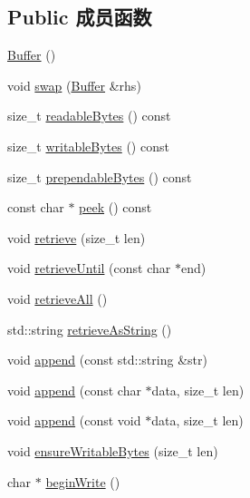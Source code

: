 \subsection*{Public 成员函数}
\begin{DoxyCompactItemize}
\item 
\hyperlink{classmuduo_1_1Buffer_a47587d18a394fb4b9508c61e3d5f0260}{Buffer} ()
\item 
void \hyperlink{classmuduo_1_1Buffer_a5a6560acf9880bf7a3b210c07bb3db2e}{swap} (\hyperlink{classmuduo_1_1Buffer}{Buffer} \&rhs)
\item 
size\+\_\+t \hyperlink{classmuduo_1_1Buffer_afba1d23196411daa43950fdbbff6d724}{readable\+Bytes} () const
\item 
size\+\_\+t \hyperlink{classmuduo_1_1Buffer_a998888da42aba8e7ff1977405f7c33e3}{writable\+Bytes} () const
\item 
size\+\_\+t \hyperlink{classmuduo_1_1Buffer_ad738bbd8321f518ca5cdfac842993d04}{prependable\+Bytes} () const
\item 
const char $\ast$ \hyperlink{classmuduo_1_1Buffer_ad1339d8b1a42e9762ae6cd3add003706}{peek} () const
\item 
void \hyperlink{classmuduo_1_1Buffer_a25a9cdb4fcb89f6e3ff071517bdc09e8}{retrieve} (size\+\_\+t len)
\item 
void \hyperlink{classmuduo_1_1Buffer_abffa19bdb1fbf4ac36fe0f2375bee1e5}{retrieve\+Until} (const char $\ast$end)
\item 
void \hyperlink{classmuduo_1_1Buffer_af505ce71f8935bcfaa932d304c295173}{retrieve\+All} ()
\item 
std\+::string \hyperlink{classmuduo_1_1Buffer_a49c703048227a7c666fca7514b60892e}{retrieve\+As\+String} ()
\item 
void \hyperlink{classmuduo_1_1Buffer_ab66de892814847f1cd274aa887c4ff66}{append} (const std\+::string \&str)
\item 
void \hyperlink{classmuduo_1_1Buffer_adece1d853752b95184d19c78228a0c39}{append} (const char $\ast$data, size\+\_\+t len)
\item 
void \hyperlink{classmuduo_1_1Buffer_af4c97664922a815eb9aa9dfe78686007}{append} (const void $\ast$data, size\+\_\+t len)
\item 
void \hyperlink{classmuduo_1_1Buffer_a1185aa5bbe069f50c8d46a9f8d5aac32}{ensure\+Writable\+Bytes} (size\+\_\+t len)
\item 
char $\ast$ \hyperlink{classmuduo_1_1Buffer_a71778facb9cd13bc2403edf59621f3f5}{begin\+Write} ()
\item 

\end{DoxyCompactItemize}
